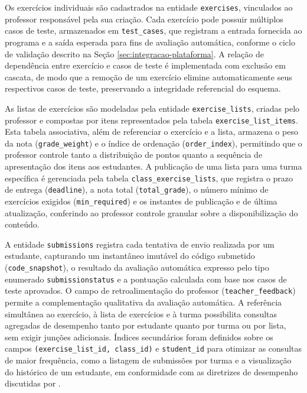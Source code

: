 Os exercícios individuais são cadastrados na entidade \texttt{exercises}, vinculados ao professor responsável pela sua criação. Cada exercício pode possuir múltiplos casos de teste, armazenados em \texttt{test\_cases}, que registram a entrada fornecida ao programa e a saída esperada para fins de avaliação automática, conforme o ciclo de validação descrito na Seção \ref{sec:integracao-plataforma}. A relação de dependência entre exercício e casos de teste é implementada com exclusão em cascata, de modo que a remoção de um exercício elimine automaticamente seus respectivos casos de teste, preservando a integridade referencial do esquema.

As listas de exercícios são modeladas pela entidade \texttt{exercise\_lists}, criadas pelo professor e compostas por itens representados pela tabela \texttt{exercise\_list\_items}. Esta tabela associativa, além de referenciar o exercício e a lista, armazena o peso da nota (\texttt{grade\_weight}) e o índice de ordenação (\texttt{order\_index}), permitindo que o professor controle tanto a distribuição de pontos quanto a sequência de apresentação dos itens aos estudantes. A publicação de uma lista para uma turma específica é gerenciada pela tabela \texttt{class\_exercise\_lists}, que registra o prazo de entrega (\texttt{deadline}), a nota total (\texttt{total\_grade}), o número mínimo de exercícios exigidos (\texttt{min\_required}) e os instantes de publicação e de última atualização, conferindo ao professor controle granular sobre a disponibilização do conteúdo.

A entidade \texttt{submissions} registra cada tentativa de envio realizada por um estudante, capturando um instantâneo imutável do código submetido (\texttt{code\_snapshot}), o resultado da avaliação automática expresso pelo tipo enumerado \texttt{submissionstatus} e a pontuação calculada com base nos casos de teste aprovados. O campo de retroalimentação do professor (\texttt{teacher\_feedback}) permite a complementação qualitativa da avaliação automática. A referência simultânea ao exercício, à lista de exercícios e à turma possibilita consultas agregadas de desempenho tanto por estudante quanto por turma ou por lista, sem exigir junções adicionais. Índices secundários foram definidos sobre os campos \texttt{(exercise\_list\_id, class\_id)} e \texttt{student\_id} para otimizar as consultas de maior frequência, como a listagem de submissões por turma e a visualização do histórico de um estudante, em conformidade com as diretrizes de desempenho discutidas por .

